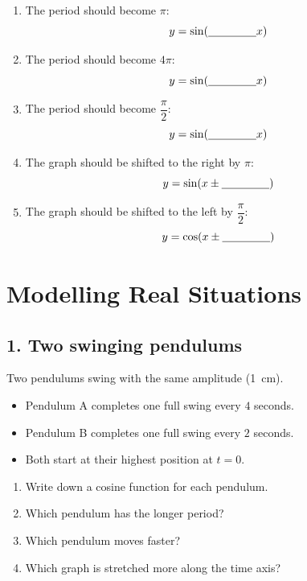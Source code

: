\documentclass[11pt,a4paper]{article}
\newcommand{\blank}[1]{\underline{\hspace{#1}}}
\begin{document}
\begin{enumerate}
\item The period should become $\pi$:
\[
y=\sin(\blank{1.5cm}x)
\]

\item The period should become $4\pi$:
\[
y=\sin(\blank{1.5cm}x)
\]

\item The period should become $\dfrac{\pi}{2}$:
\[
y=\sin(\blank{1.5cm}x)
\]

\item The graph should be shifted to the right by $\pi$:
\[
y=\sin(x\mathbin{\pm}\blank{1.5cm})
\]

\item The graph should be shifted to the left by $\dfrac{\pi}{2}$:
\[
y=\cos(x\mathbin{\pm}\blank{1.5cm})
\]
\end{enumerate}

\newpage


\section*{Modelling Real Situations}

\subsection*{1. Two swinging pendulums}

Two pendulums swing with the same amplitude (\SI{1}{cm}).

\begin{itemize}
\item Pendulum A completes one full swing every $4$ seconds.
\item Pendulum B completes one full swing every $2$ seconds.
\item Both start at their highest position at $t=0$.
\end{itemize}

\begin{enumerate}[label=\alph*)]
\item Write down a cosine function for each pendulum.
\item Which pendulum has the longer period?
\item Which pendulum moves faster?
\item Which graph is stretched more along the time axis?
\end{enumerate}
\end{document}
